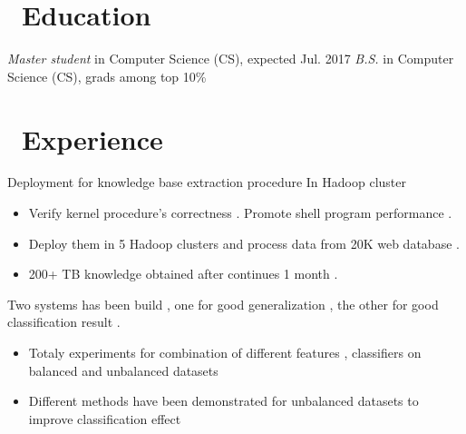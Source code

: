 \documentclass{resume}
\begin{document}



\section{\faGraduationCap\ Education}
\textit{Master student} in Computer Science (CS), expected Jul. 2017
\textit{B.S.} in Computer Science (CS), grads among top 10\%

\section{\faUsers\ Experience}
Deployment for knowledge base extraction procedure In Hadoop cluster 
\begin{itemize}
  \item Verify kernel procedure's  correctness . Promote shell program performance .
  \item Deploy them in 5 Hadoop clusters and process data from 20K web database . 
  \item 200+ TB knowledge obtained after continues 1 month .  
\end{itemize}

Two systems has been build , one for good generalization , the other for good classification result .
\begin{itemize}
  \item Totaly experiments for combination of different features , classifiers on balanced and unbalanced datasets 
  \item Different methods have been demonstrated for unbalanced datasets to improve classification effect
\end{itemize}
\end{document}
